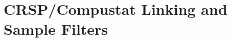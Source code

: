 \documentclass[12pt,a4paper,oneside]{report}
\begin{document}
\section{CRSP/Compustat Linking and Sample Filters}
\label{sec:crsp_ccm}
\end{document}
